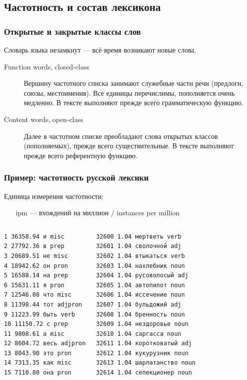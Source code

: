 \documentclass[svgnames]{beamer}
\begin{document}
\subsection{Частотность и состав лексикона}

  \begin{frame}
    \frametitle{Открытые и закрытые классы слов}
      Словарь языка незамкнут — всё время возникают новые слова.
    \begin{description}
    \item[Function words, closed-class] 
      Вершину частотного списка занимают служебные части речи
      (\alert{предлоги, союзы, местоимения}). Все единицы перечислимы,
      пополняется очень медленно. В тексте выполняют прежде всего
      грамматическую функцию. 
    \item[Content words, open-class]
      Далее в частотном списке преобладают слова открытых классов (пополняемых), прежде
      всего \alert{существительные}. В тексте выполняют прежде всего
      референтную функцию.
    \end{description}
  \end{frame}


\begin{frame}[fragile]
  \frametitle{Пример: частотность русской лексики}
  Единица измерения частотности:
  \begin{itemize}
  \item[ipm] — вхождений на миллион / instances per million 
  \end{itemize}
  \small
  \begin{columns}
    
\begin{verbatim}
1 36358.94 и misc 
2 27792.36 в prep 
3 20689.51 не misc 
4 18942.62 он pron 
5 16588.14 на prep 
6 15631.11 я pron 
7 12546.08 что misc 
8 11398.44 тот adjpron
9 11223.99 быть verb 
10 11150.72 с prep 
11 9808.61 а misc 
12 8604.72 весь adjpron
13 8043.90 это pron 
14 7313.35 как misc 
15 7110.80 она pron 
\end{verbatim}
\begin{verbatim}
32600 1.04 мертветь verb
32601 1.04 сволочной adj
32602 1.04 втыкаться verb
32603 1.04 нахлебник noun
32604 1.04 русоволосый adj
32605 1.04 автопилот noun
32606 1.04 иссечение noun
32607 1.04 бульдожий adj
32608 1.04 бренность noun
32609 1.04 нездоровье noun
32610 1.04 саргасса noun
32611 1.04 коротковатый adj
32612 1.04 кукурузник noun
32613 1.04 шарлатанство noun
32614 1.04 селекционер noun
\end{verbatim}
  \end{columns}
\end{frame}
  
\end{document}
